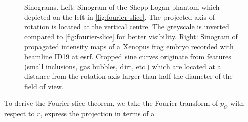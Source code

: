 \documentclass[
twoside,
openright,
titlepage,
numbers=noenddot,
headinclude,
fleqn,
a4paper,
footinclude=true,
cleardoublepage=empty,
abstractoff,
BCOR=5mm,
paper=a4,
fontsize=11pt,
british,ngerman,american,
]{scrreprt}
\begin{document}
\begin{figure} 
  \centering
  \caption[Sinograms of Shepp-Logan phantom and Xenopus
  frog.]{Sinograms. Left: Sinogram of the Shepp-Logan phantom which
    depicted on the left  in \cref{fig:fourier-slice}.  The
    projected axis of rotation is located at the vertical centre.  The
    greyscale is inverted compared to \cref{fig:fourier-slice} for
    better visibility. Right: Sinogram of propagated intensity maps of
    a Xenopus frog embryo recorded with beamline ID19 at \ac{esrf}.
    Cropped sine curves originate from features (small inclusions, gas
    bubbles, dirt, etc.) which are located at a distance from the
    rotation axis larger than half the diameter of the field of view.}
  \label{fig:sinogram}
\end{figure}
To derive the Fourier slice theorem, we take the Fourier transform of
$p_\Theta$ with respect to $r$, express the projection in terms of a
\end{document}
